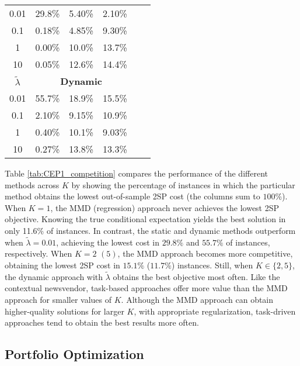 \begin{table}[h]
\begin{minipage}{0.49\textwidth}
{\begin{tabular}{cccccc}
        \midrule
        0.01 & 29.8\% & 5.40\%  & 2.10\%  \\
        0.1  & 0.18\%  & 4.85\%  & 9.30\%  \\
        1    & 0.00\%  & 10.0\% & 13.7\% \\
        10   & 0.05\%  & 12.6\% & 14.4\% \\
        \midrule
        \multicolumn{1}{c}{$\tilde{\lambda}$} &  \multicolumn{3}{c}{\textbf{Dynamic}} \\
        \midrule
        0.01 & 55.7\% & 18.9\% & 15.5\% \\
        0.1  & 2.10\%  & 9.15\%  & 10.9\% \\
        1    & 0.40\%  & 10.1\% & 9.03\%  \\
        10   & 0.27\%  & 13.8\% & 13.3\% \\ 
        \bottomrule
        \end{tabular}}{}
    \end{minipage}
    \hfill
\end{table}


Table \ref{tab:CEP1_competition} compares the performance of the different methods across $K$ by showing the percentage of instances in which the particular method obtains the lowest out-of-sample 2SP cost (the columns sum to $100\%$). When $K=1$, the MMD (regression) approach never achieves the lowest 2SP objective. Knowing the true conditional expectation yields the best solution in only 11.6\% of instances. In contrast, the static and dynamic methods outperform when $\tilde{\lambda} = 0.01$, achieving the lowest cost in $29.8\%$ and $55.7\%$ of instances, respectively. When $K = 2$ $(5)$, the MMD approach becomes more competitive, obtaining the lowest 2SP cost in $15.1\%$ ($11.7\%$) instances. Still, when $K \in \{2, 5\}$, the dynamic approach with $\tilde{\lambda}$ obtains the best objective most often. Like the contextual newsvendor, task-based approaches offer more value than the MMD approach for smaller values of $K$. Although the MMD approach can obtain higher-quality solutions for larger $K$, with appropriate regularization, task-driven approaches tend to obtain the best results more often.


\subsection{Portfolio Optimization} 

